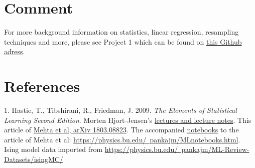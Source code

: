 \documentclass[a4paper,12pt]{article}
\begin{document}
\section{Comment}
For more background information on statistics, linear regression, resampling techniques and more, please see Project 1 which can be found on \href{https://github.com/gunnartl/fys-stk4155/blob/master/project1/FYS_STK_prosjekt_1_Rapport.pdf}{this Github adress}.

\section{References}
1. Hastie, T., Tibshirani, R., Friedman, J. 2009. \emph{The Elements of Statistical Learning Second Edition}. Morten Hjort-Jensen's \href{https://compphysics.github.io/MachineLearning/doc/web/course.html}{lectures and lecture notes}. This article of \href{{https://arxiv.org/abs/1803.08823}}{Mehta et al, arXiv
1803.08823}. The accompanied \href{https://physics.bu.edu/~pankajm/MLnotebooks.html}{notebooks} to the article of Mehta et al: \href{https://physics.bu.edu/~pankajm/MLnotebooks.html}{https://physics.bu.edu/~pankajm/MLnotebooks.html}. Ising model data imported from \href{https://physics.bu.edu/~pankajm/ML-Review-Datasets/isingMC/}{https://physics.bu.edu/~pankajm/ML-Review-Datasets/isingMC/}
\end{document}
